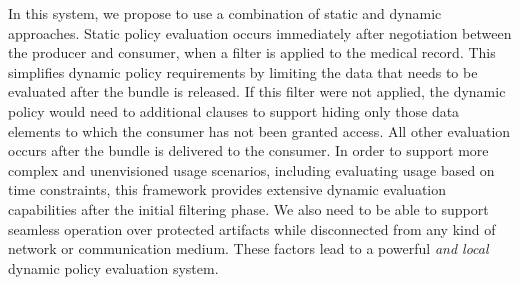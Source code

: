 \documentclass[10pt, conference, compsocconf]{IEEEtran}
\begin{document}
In this system, we propose to use a combination of static and dynamic approaches.  Static policy evaluation occurs immediately after negotiation between the producer and consumer, when a filter is applied to the medical record.  This simplifies dynamic policy requirements by limiting the data that needs to be evaluated after the bundle is released.  If this filter were not applied, the dynamic policy would need to additional clauses to support hiding only those data elements to which the consumer has not been granted access.  All other evaluation occurs after the bundle is delivered to the consumer.  In order to support more complex and unenvisioned usage scenarios, including evaluating usage based on time constraints, this framework provides extensive dynamic evaluation capabilities after the initial filtering phase.  We also need to be able to support seamless operation over protected artifacts while disconnected from any kind of network or communication medium.  These factors lead to a powerful \textit{and local} dynamic policy evaluation system.

%
%

\end{document}
